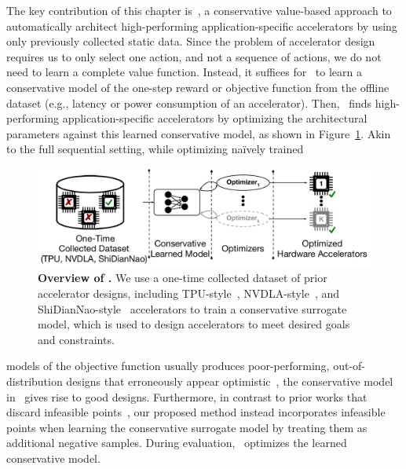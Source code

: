 The key contribution of this chapter is \primemethodname\,, a conservative value-based approach to automatically architect high-performing application-specific accelerators by using only previously collected static data. Since the problem of accelerator design requires us to only select one action, and not a sequence of actions, we do not need to learn a complete value function. Instead, it suffices for \primemethodname\ to learn a conservative model of the one-step reward or objective function from the offline dataset (e.g., latency or power consumption of an accelerator).
Then, \primemethodname\ finds high-performing application-specific accelerators by optimizing the architectural parameters against this learned conservative model, as shown in Figure~\ref{fig:prime_overview}. Akin to the full sequential setting, while optimizing na\"ively trained
\begin{figure}[t!]
    \centering
    \vspace{-0.1cm}
    \includegraphics[width=0.8\linewidth]{chapters/prime/figs/overview/prime-overview.pdf}
    \vspace{-0.2cm}
    \caption{\footnotesize{\textbf{Overview of \primemethodname.} We use a one-time collected dataset of prior accelerator designs, including TPU-style~\citep{yazdanbakhsh2021evaluation}, NVDLA-style~\citep{nvdla}, and ShiDianNao-style~\citep{shidiannao} accelerators to train a conservative surrogate model, which is used to design accelerators to meet desired goals and constraints.}}
    \vspace{-0.4cm}
    \label{fig:prime_overview}
\end{figure}
models of the objective function usually produces poor-performing, out-of-distribution designs that erroneously appear optimistic~\citep{kumar2019model,brookes19a,trabucco2021conservative},
the conservative model in \primemethodname\ gives rise to good designs. Furthermore, in contrast to prior works that discard infeasible points~\citep{hegdemind,trabucco2021conservative}, our proposed method instead incorporates infeasible points when learning the conservative surrogate model by treating them as additional negative samples. During evaluation, \primemethodname\ optimizes the learned conservative model.

